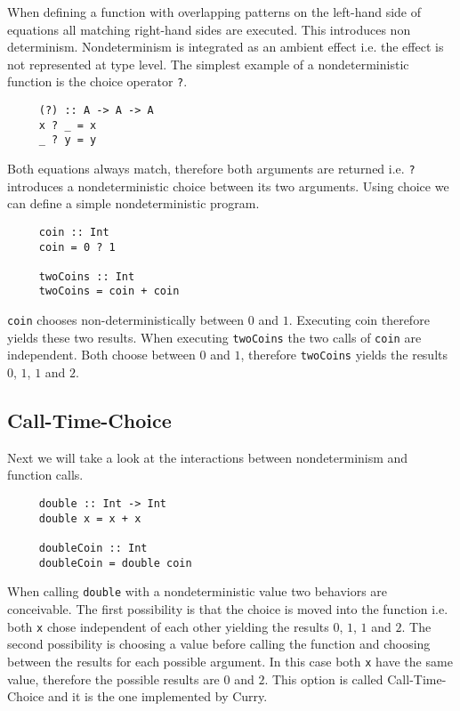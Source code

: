 \documentclass[10pt,a4paper,twoside]{report}
\begin{document}
When defining a function with overlapping patterns on the left-hand side of
equations all matching right-hand sides are executed.
This introduces non determinism.
Nondeterminism is integrated as an ambient effect i.e. the effect is not
represented at type level.
The simplest example of a nondeterministic function is the choice operator
\texttt{?}.

\begin{verbatim}
     (?) :: A -> A -> A
     x ? _ = x
     _ ? y = y
\end{verbatim}
Both equations always match, therefore both arguments are returned i.e.
\texttt{?} introduces a nondeterministic choice between its two arguments.
Using choice we can define a simple nondeterministic program.

\begin{verbatim}
     coin :: Int
     coin = 0 ? 1

     twoCoins :: Int
     twoCoins = coin + coin
\end{verbatim}
\texttt{coin} chooses non-deterministically between $0$ and $1$.
Executing coin therefore yields these two results.
When executing \texttt{twoCoins} the two calls of \texttt{coin} are independent.
Both choose between $0$ and $1$, therefore \texttt{twoCoins} yields the results
$0$, $1$, $1$ and $2$.

\subsection{Call-Time-Choice}
\label{call-time-choice}
Next we will take a look at the interactions between nondeterminism and function
calls.

\begin{verbatim}
     double :: Int -> Int
     double x = x + x
     
     doubleCoin :: Int
     doubleCoin = double coin
\end{verbatim}
When calling \texttt{double} with a nondeterministic value two behaviors are
conceivable.
The first possibility is that the choice is moved into the function i.e. both
\texttt{x} chose independent of each other yielding the results $0$, $1$, $1$
and $2$.
The second possibility is choosing a value before calling the function and
choosing between the results for each possible argument.
In this case both \texttt{x} have the same value, therefore the possible results
are $0$ and $2$.
This option is called Call-Time-Choice and it is the one implemented by Curry.
\end{document}
